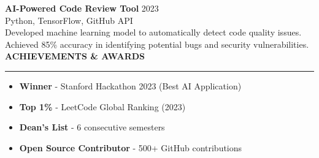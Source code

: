 \documentclass[a4paper,10pt]{article}
\newcommand{\cvsection}[1]{
    \vspace{10pt}
    {\color{primary}\Large\bfseries #1}
    \vspace{5pt}
    \hrule
    \vspace{10pt}
}
\newcommand{\cvitem}[1]{
    \item #1
}
\begin{document}
\begin{minipage}[t]{0.6\textwidth}
\textbf{\color{primary}AI-Powered Code Review Tool} \hfill {\color{secondary}2023}\\
{\color{accent}Python, TensorFlow, GitHub API}\\
Developed machine learning model to automatically detect code quality issues. Achieved 85\% accuracy in identifying potential bugs and security vulnerabilities.\\

\cvsection{ACHIEVEMENTS \& AWARDS}

\begin{itemize}[leftmargin=15pt]
    \cvitem{\textbf{\color{primary}Winner} - Stanford Hackathon 2023 (Best AI Application)}
    \cvitem{\textbf{\color{primary}Top 1\%} - LeetCode Global Ranking (2023)}
    \cvitem{\textbf{\color{primary}Dean's List} - 6 consecutive semesters}
    \cvitem{\textbf{\color{primary}Open Source Contributor} - 500+ GitHub contributions}
\end{itemize}

\end{minipage}
\end{document}
